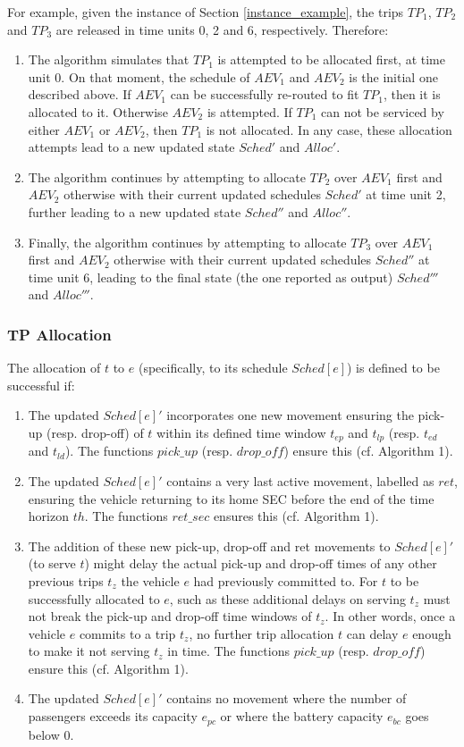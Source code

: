 For example, given the instance of Section \ref{instance_example}, the trips $TP_1$, $TP_2$ and $TP_3$ are released in time units 0,  2 and 6, respectively.  Therefore: 
\begin{enumerate}
\item The algorithm simulates that $TP_1$  is attempted to be allocated first, at time unit 0.  On that moment, the schedule of $AEV_1$ and $AEV_2$ is the initial one described above.  If $AEV_1$ can be successfully re-routed to fit $TP_1$, then it is allocated to it. Otherwise $AEV_2$ is attempted.  If $TP_1$ can not be serviced by either $AEV_1$ or $AEV_2$, then $TP_1$ is not allocated.  In any case, these allocation attempts lead to a new updated state $Sched'$ and $Alloc'$.
\item The algorithm continues by attempting to allocate $TP_2$ over $AEV_1$ first and $AEV_2$ otherwise with their current updated schedules $Sched'$ at time unit 2,  further leading to a new updated state $Sched''$ and $Alloc''$.
\item Finally, the algorithm continues by attempting to allocate $TP_3$ over $AEV_1$ first and $AEV_2$ otherwise with their current updated schedules $Sched''$ at time unit 6, leading to the final state (the one reported as output) $Sched'''$ and $Alloc'''$.
\end{enumerate} 

\subsubsection{TP Allocation}
\label{fitting_into_sched}

The allocation of $t$ to $e$ (specifically, to its schedule $Sched[e]$) is defined to be successful if: 
\begin{enumerate}
\item The updated $Sched[e]'$ incorporates one new movement ensuring the pick-up (resp. drop-off) of $t$ within its defined time window $t_{ep}$ and $t_{lp}$ (resp.  $t_{ed}$ and $t_{ld}$). The functions $pick\_up$ (resp. $drop\_off$) ensure this (cf.  Algorithm 1). 
\item The updated $Sched[e]'$ contains a very last active movement, labelled as $ret$, ensuring the vehicle returning to its home SEC before the end of the time horizon $th$.  The functions $ret\_sec$ ensures this (cf.  Algorithm 1). 
\item The addition of these new pick-up, drop-off and ret movements to $Sched[e]'$ (to serve $t$) might delay the actual pick-up and drop-off times of any other previous trips $t_z$ the vehicle $e$ had previously committed to. For $t$ to be successfully allocated to $e$, such as these additional delays on serving $t_z$ must not break the pick-up and drop-off time windows of $t_z$.  In other words, once a vehicle $e$ commits to a trip $t_z$,  no further trip allocation $t$ can delay $e$ enough to make it not serving $t_z$ in time. The functions $pick\_up$ (resp. $drop\_off$) ensure this (cf.  Algorithm 1).  
\item The updated $Sched[e]'$ contains no movement where the number of passengers exceeds its capacity $e_{pc}$ or where the battery capacity $e_{bc}$ goes below 0. 
\end{enumerate} 

